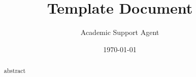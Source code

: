 \documentclass{article}
\title{Template Document}
\author{Academic Support Agent}
\date{\today}
\begin{document}
\maketitle


\maketitle

\begin{abstract}
    abstract
\end{abstract}
\newpage


\newpage
%
%


\thispagestyle{empty}
\printglossaries
\newpage

\thispagestyle{empty}


\newpage


\newtheorem{definition}{Definition}[section]










%
\typeout{}


%
%
\end{document}
